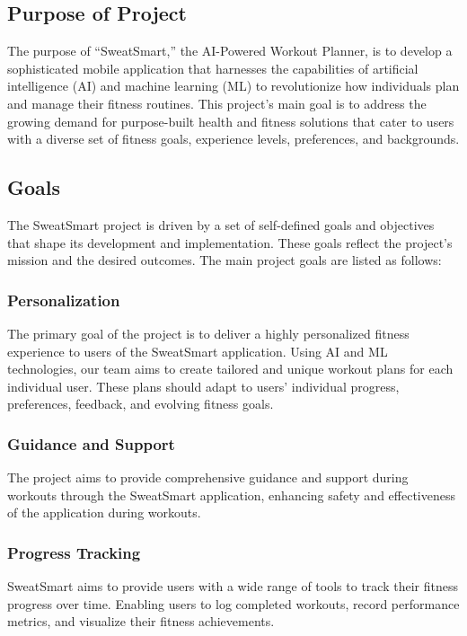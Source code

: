 \documentclass[12pt]{article}
\begin{document}
\subsection{Purpose of Project}
The purpose of “SweatSmart,” the AI-Powered Workout Planner, is to develop a sophisticated mobile application that harnesses the capabilities of artificial intelligence (AI) and machine learning (ML) to revolutionize how individuals plan and manage their fitness routines. This project’s main goal is to address the growing demand for purpose-built health and fitness solutions that cater to users with a diverse set of fitness goals, experience levels, preferences, and backgrounds.

\subsection{Goals}
The SweatSmart project is driven by a set of self-defined goals and objectives that shape its development and implementation. These goals reflect the project’s mission and the desired outcomes. The main project goals are listed as follows:

\subsubsection{Personalization}
The primary goal of the project is to deliver a highly personalized fitness experience to users of the SweatSmart application. Using AI and ML technologies, our team aims to create tailored and unique workout plans for each individual user. These plans should adapt to users’ individual progress, preferences, feedback, and evolving fitness goals.

\subsubsection{Guidance and Support}
The project aims to provide comprehensive guidance and support during workouts through the SweatSmart application, enhancing safety and effectiveness of the application during workouts.

\subsubsection{Progress Tracking}
SweatSmart aims to provide users with a wide range of tools to track their fitness progress over time. Enabling users to log completed workouts, record performance metrics, and visualize their fitness achievements.
\end{document}
